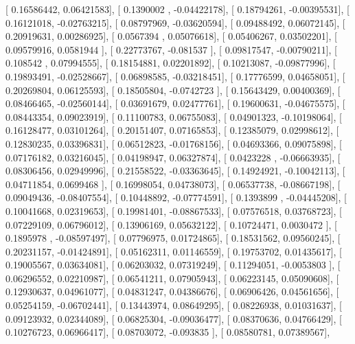 \documentclass{article}
\begin{document}
       [ 0.16586442,  0.06421583],
       [ 0.1390002 , -0.04422178],
       [ 0.18794261, -0.00395531],
       [ 0.16121018, -0.02763215],
       [ 0.08797969, -0.03620594],
       [ 0.09488492,  0.06072145],
       [ 0.20919631,  0.00286925],
       [ 0.0567394 ,  0.05076618],
       [ 0.05406267,  0.03502201],
       [ 0.09579916,  0.0581944 ],
       [ 0.22773767, -0.081537  ],
       [ 0.09817547, -0.00790211],
       [ 0.108542  ,  0.07994555],
       [ 0.18154881,  0.02201892],
       [ 0.10213087, -0.09877996],
       [ 0.19893491, -0.02528667],
       [ 0.06898585, -0.03218451],
       [ 0.17776599,  0.04658051],
       [ 0.20269804,  0.06125593],
       [ 0.18505804, -0.0742723 ],
       [ 0.15643429,  0.00400369],
       [ 0.08466465, -0.02560144],
       [ 0.03691679,  0.02477761],
       [ 0.19600631, -0.04675575],
       [ 0.08443354,  0.09023919],
       [ 0.11100783,  0.06755083],
       [ 0.04901323, -0.10198064],
       [ 0.16128477,  0.03101264],
       [ 0.20151407,  0.07165853],
       [ 0.12385079,  0.02998612],
       [ 0.12830235,  0.03396831],
       [ 0.06512823, -0.01768156],
       [ 0.04693366,  0.09075898],
       [ 0.07176182,  0.03216045],
       [ 0.04198947,  0.06327874],
       [ 0.0423228 , -0.06663935],
       [ 0.08306456,  0.02949996],
       [ 0.21558522, -0.03363645],
       [ 0.14924921, -0.10042113],
       [ 0.04711854,  0.0699468 ],
       [ 0.16998054,  0.04738073],
       [ 0.06537738, -0.08667198],
       [ 0.09049436, -0.08407554],
       [ 0.10448892, -0.07774591],
       [ 0.1393899 , -0.04445208],
       [ 0.10041668,  0.02319653],
       [ 0.19981401, -0.08867533],
       [ 0.07576518,  0.03768723],
       [ 0.07229109,  0.06796012],
       [ 0.13906169,  0.05632122],
       [ 0.10724471,  0.0030472 ],
       [ 0.1895978 , -0.08597497],
       [ 0.07796975,  0.01724865],
       [ 0.18531562,  0.09560245],
       [ 0.20231157, -0.01424891],
       [ 0.05162311,  0.01146559],
       [ 0.19753702,  0.01435617],
       [ 0.19005567,  0.03634081],
       [ 0.06203032,  0.07319249],
       [ 0.11294051, -0.0053803 ],
       [ 0.06296552,  0.02210987],
       [ 0.06541211,  0.07905943],
       [ 0.06223145,  0.05090608],
       [ 0.12930637,  0.04961077],
       [ 0.04831247,  0.04386676],
       [ 0.06906426,  0.04561656],
       [ 0.05254159, -0.06702441],
       [ 0.13443974,  0.08649295],
       [ 0.08226938,  0.01031637],
       [ 0.09123932,  0.02344089],
       [ 0.06825304, -0.09036477],
       [ 0.08370636,  0.04766429],
       [ 0.10276723,  0.06966417],
       [ 0.08703072, -0.093835  ],
       [ 0.08580781,  0.07389567],
\end{document}

